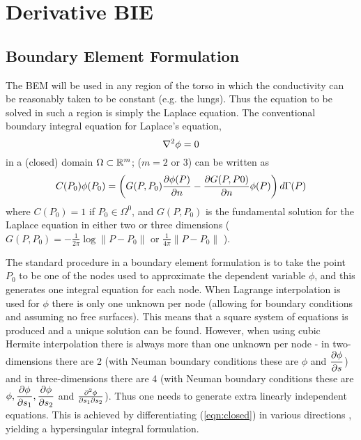 \chapter{Derivative BIE}

\section{Boundary Element Formulation}

The BEM will be used in any region of the torso in which the conductivity can
be reasonably taken to be constant (e.g. the lungs).  Thus the equation to be
solved in such a region is simply the Laplace equation.  The conventional
boundary integral equation for Laplace's equation, 
\begin{equation}
  \laplacian{}{\phi} = 0
  \label{eqn:Laplace}
\end{equation}
in a (closed) domain $\Omega \subset  \mathbb{R} ^{m}$; ($m=2$ or $3$) can be written as
\begin{equation}
  C(P_{0})\phi(P_{0}) =
  \left(G(P,P_{0}) \dfrac{\partial \phi(P)}{\partial n} - \dfrac{\partial G(P,P0)}{\partial n} \phi(P)\right)
  d\Gamma(P)
  \label{eqn:closed}
\end{equation}
where $C(P_{0}) = 1$ if $P_{0}\in \Omega^{0}$, and $G(P,P_{0})$ is the
fundamental solution for the Laplace equation in either two or three
dimensions (\ie $G(P,P_{0}) = -\frac{1}{2\pi}\log \parallel P
-P_{0}\parallel$ or $\frac{1}{4\pi}\parallel P-P_{0}\parallel$ ).

The standard procedure in a boundary element formulation is to take the point
$P_{0}$ to be one of the nodes used to approximate the dependent variable
$\phi$, and this generates one integral equation for each node.  When Lagrange
interpolation is used for $\phi$ there is only one unknown per node (allowing
for boundary conditions and assuming no free surfaces). This means that a
square system of equations is produced and a unique solution can be found.
However, when using cubic Hermite interpolation there is always more than one
unknown per node - in two-dimensions there are 2 (with Neuman boundary
conditions these are $\phi$ and $ \dfrac{\partial \phi}{\partial s} $) and in three-dimensions
there are 4 (with Neuman boundary conditions these are $\phi,
 \dfrac{\partial \phi}{\partial s_{1}} ,  \dfrac{\partial \phi}{\partial s_{2}} $ and $\frac{\partial^{2}\phi}{\partial
  s_{1}\partial s_{2}}$).  Thus one needs to generate extra linearly independent
equations.  This is achieved by differentiating (\ref{eqn:closed}) in various
directions \citep{tomlinson:1996}, yielding a hypersingular integral
formulation.

